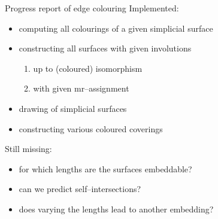 \begin{frame}{Progress report of edge colouring}
    \pause
    Implemented:
    \begin{itemize}
        \pause
        \item computing all colourings of a given simplicial surface
        \pause
        \item constructing all surfaces with given involutions
            \begin{enumerate}
                \pause
                \item up to (coloured) isomorphism
                \pause
                \item with given mr--assignment
            \end{enumerate}
        \pause
        \item drawing of simplicial surfaces
        \pause
        \item constructing various coloured coverings
    \end{itemize}

    \pause
    Still missing:
    \begin{itemize}
        \pause
        \item for which lengths are the surfaces embeddable?
        \pause
        \item can we predict self--intersections?
        \pause
        \item does varying the lengths lead to another embedding?
    \end{itemize}
\end{frame}
